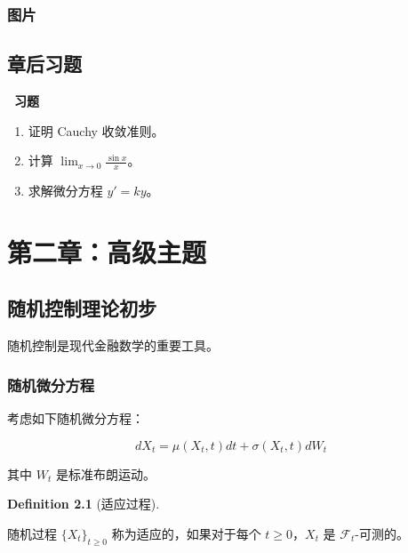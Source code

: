 \documentclass[
  11pt,
  letterpaper,
  oneside,
  a4paper]{book}
\makeatletter
\providecommand{\tightlist}{%
  \setlength{\itemsep}{0pt}\setlength{\parskip}{0pt}}
\newcounter{problem}[chapter]
\newenvironment{problemset}[1][习题]{
  \vspace*{10pt}
  \begin{center}
    \textcolor{structurecolor}{\Large\bfseries\adftripleflourishleft~#1~\adftripleflourishright}
  \end{center}}{
  \par}
\numberwithin{equation}{chapter}
\def\cleardoublepage{\clearpage\ifodd\c@page\else
    \hbox{}\thispagestyle{empty}\newpage\fi}
\let\oldchapter\chapter
\renewcommand{\chapter}{%
    \cleardoublepage
    \oldchapter
  }%
\theoremstyle{plain}
\theoremstyle{plain}
\theoremstyle{plain}
\theoremstyle{plain}
\theoremstyle{definition}
\newtheorem{definition}{Definition}[chapter]
\theoremstyle{remark}
\makeatother
\begin{document}
\subsection{图片}\label{ux56feux7247}

\section{章后习题}\label{ux7ae0ux540eux4e60ux9898}

\begin{problemset}

\begin{enumerate}
\def\labelenumi{\arabic{enumi}.}
\tightlist
\item
  证明 Cauchy 收敛准则。
\item
  计算 \(\lim_{x \to 0} \frac{\sin x}{x}\)。
\item
  求解微分方程 \(y' = ky\)。
\end{enumerate}

\end{problemset}


\chapter{第二章：高级主题}\label{ux7b2cux4e8cux7ae0ux9ad8ux7ea7ux4e3bux9898}

\section{随机控制理论初步}\label{ux968fux673aux63a7ux5236ux7406ux8bbaux521dux6b65}

随机控制是现代金融数学的重要工具。

\subsection{随机微分方程}\label{ux968fux673aux5faeux5206ux65b9ux7a0b}

考虑如下随机微分方程：

\begin{equation} dX_t = \mu(X_t, t) dt + \sigma(X_t, t) dW_t \end{equation}

其中 \(W_t\) 是标准布朗运动。

\begin{definition}[适应过程]\protect\hypertarget{def-adapted}{}\label{def-adapted}

随机过程 \(\{X_t\}_{t \geq 0}\) 称为适应的，如果对于每个
\(t \geq 0\)，\(X_t\) 是 \(\mathcal{F}_t\)-可测的。

\end{definition}
\end{document}
